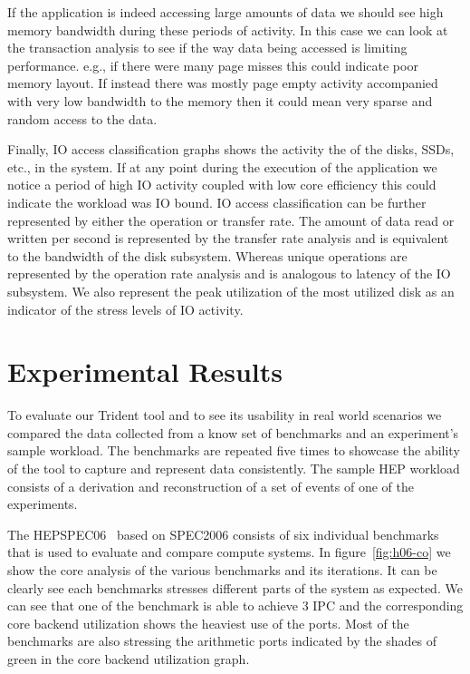 \documentclass{webofc}
\begin{document}
If the application is indeed accessing large amounts of data we should see high memory bandwidth during these periods of activity. In this case we can look at the transaction analysis to see if the way data being accessed is limiting performance. e.g., if there were many page misses this could indicate poor memory layout. If instead there was mostly page empty activity accompanied with very low bandwidth to the memory then it could mean very sparse and random access to the data. 

Finally, IO access classification graphs shows the activity the of the disks, SSDs, etc., in the system. If at any point during the execution of the application we notice a period of high IO activity coupled with low core efficiency this could indicate the workload was IO bound. IO access classification can be further represented by either the operation or transfer rate. The amount of data read or written per second is represented by the transfer rate analysis and is equivalent to the bandwidth of the disk subsystem. Whereas unique operations are represented by the operation rate analysis and is analogous to latency of the IO subsystem. We also represent the peak utilization of the most utilized disk as an indicator of the stress levels of IO activity.

\section{Experimental Results}
\label{sec:results}

To evaluate our Trident tool and to see its usability in real world scenarios we compared the data collected from a know set of benchmarks and an experiment's sample workload. The benchmarks are repeated five times to showcase the ability of the tool to capture and represent data consistently. The sample HEP workload consists of a derivation and reconstruction of a set of events of one of the experiments.

The HEPSPEC06~\cite{} based on SPEC2006 consists of six individual benchmarks that is used to evaluate and compare compute systems. In figure~\ref{fig:h06-co} we show the core analysis of the various benchmarks and its iterations. It can be clearly see each benchmarks stresses different parts of the system as expected. We can see that one of the benchmark is able to achieve 3 IPC and the corresponding core backend utilization shows the heaviest use of the ports. Most of the benchmarks are also stressing the arithmetic ports indicated by the shades of green in the core backend utilization graph.
\end{document}
